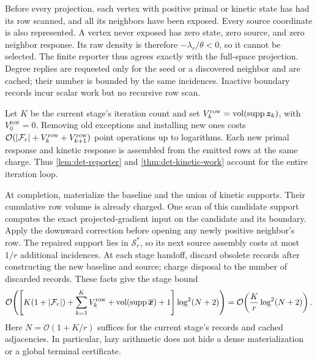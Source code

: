 Before every projection, each vertex with positive primal or kinetic state
has had its row scanned, and all its neighbors have been exposed. Every
source coordinate is also represented. A vertex never exposed has zero
state, zero source, and zero neighbor response. Its raw density is therefore
$-\lambda_r/\theta<0$, so it cannot be selected. The finite reporter thus
agrees exactly with the full-space projection. Degree replies are requested
only for the seed or a discovered neighbor and are cached; their number is
bounded by the same incidences. Inactive boundary records incur scalar
work but no recursive row scan.

Let $K$ be the current stage's iteration count and set
$V_k^{\mathrm{row}}=\operatorname{vol}(\operatorname{supp}\bm{z}_k)$, with $V_0^{\mathrm{row}}=0$.
Removing old exceptions and installing new ones costs
$\mathcal{O}(|\mathcal{F}_r|+V_k^{\mathrm{row}}+V_{k+1}^{\mathrm{row}})$ point operations up to
logarithms. Each new primal response and kinetic response is assembled from
the emitted rows at the same charge. Thus \cref{lem:det-reporter} and
\cref{thm:det-kinetic-work} account for the entire iteration loop.

At completion, materialize the baseline and the union of kinetic supports.
Their cumulative row volume is already charged. One scan of this candidate
support computes the exact projected-gradient input on the candidate and
its boundary. Apply the downward correction before opening any newly
positive neighbor's row. The repaired support lies in $\mathcal S_r^*$,
so its next source assembly costs at most $1/r$ additional incidences.
At each stage handoff, discard obsolete records after constructing the new
baseline and source; charge disposal to the number of discarded records.
These facts
give the stage bound
\begin{equation}
 \mathcal{O}\!\left(
  \left[K(1+|\mathcal{F}_r|)+\sum_{k=1}^KV_k^{\mathrm{row}}
              +\operatorname{vol}(\operatorname{supp}\overline{\bm{x}})+1\right]
  \log^2(N+2)\right)
 =\mathcal{O}\!\left(\frac Kr\log^2(N+2)\right).
 \label{eq:det-stage-ledger}
\end{equation}
Here $N=\mathcal{O}(1+K/r)$ suffices for the current stage's records and cached
adjacencies. In particular, lazy arithmetic does not hide a dense
materialization or a global terminal certificate.


